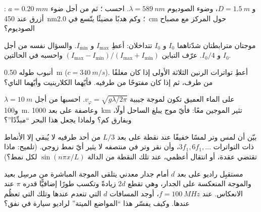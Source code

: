 \begin{exercise}[$\star\star$]\label{exo:b1:wave-propagation:7}
: $a = \qty{0.20}{mm}$ و $D = \qty{1.5}{m}$، وضوء الصوديوم
$\lambda = \qty{589}{nm}$. احسب ؛ ثم من أجل ضوء أزرق
عند \qty{450}{nm}؛ وكم هدبًا مضيئًا يتّسع في \qty{2.0}{cm}
حول المركز مع مصباح الصوديوم؟
\end{exercise}

\begin{exercise}[$\star\star$]\label{exo:b1:wave-propagation:8}
موجتان مترابطتان شدّتاهما $I_0$ و $I_0$ تتداخلان: أعطِ
$I_{\max}$ و $I_{\min}$. والسؤال نفسه من أجل $I_0$ و $I_0/4$. عرّف
التباين $(I_{\max} - I_{\min})/(I_{\max} + I_{\min})$ واحسبه
في الحالتين.
\end{exercise}

\begin{exercise}[$\star\star$]\label{exo:b1:wave-propagation:9}
أنبوب طوله \qty{0.50}{m} ($c = \qty{340}{m/s}$). أعطِ تواترات
الرنين الثلاثة الأولى إذا كان مغلقًا من طرف، ثم إذا كان مفتوحًا من
طرفيه. فأيّهما الكلارينيت وأيّهما الناي؟
\end{exercise}

\begin{exercise}[$\star\star\star$]\label{exo:b1:wave-propagation:10}
على الماء العميق تكون  لموجة جيبية
$v_\varphi = \sqrt{g\lambda/2\pi}$. احسبها من أجل $\lambda = \qty{10}{m}$
و\qty{100}{m}. وعاصفة على بعد \qty{1000}{km} تثير الموجين معًا: فأيّ موج
يبلغ الساحل أولًا، وبفارق كم؟ ولماذا يجعل هذا البحر
``مبدِّدًا''؟
\end{exercise}

\begin{exercise}[$\star\star\star$]\label{exo:b1:wave-propagation:11}
بيّن أن لمس وتر لمسًا خفيفًا عند نقطة على بعد $L/3$ من أحد طرفيه
لا يُبقي إلا الأنماط ذات التواترات $3f_1, 6f_1, \dots$، وأن
نقر وتر في منتصفه لا يثير أيّ نمط زوجي. (تلميح: ماذا
تقتضي عقدة، أو انتقال أعظمي، عند تلك النقطة من الدالة
$\sin(n\pi x/L)$ لكل نمط؟)
\end{exercise}

\begin{exercise}[$\star\star\star$]\label{exo:b1:wave-propagation:12}
مستقبِل راديو على بعد $d$ أمام جدار معدني يتلقى
الموجة المباشرة من مرسِل بعيد والموجة المنعكسة على
الجدار، وهي تقطع $2d$ زيادةً وتكسب طورًا إضافيًّا قدره $\pi$ عند
الانعكاس. عند $f = \qty{100}{MHz}$، أوجد المسافات $d$ التي تنعدم عندها
 وتلك التي تعظُم عندها. وكيف يفسّر هذا
``المواضع الميتة'' لراديو سيارة في نفق؟
\end{exercise}

